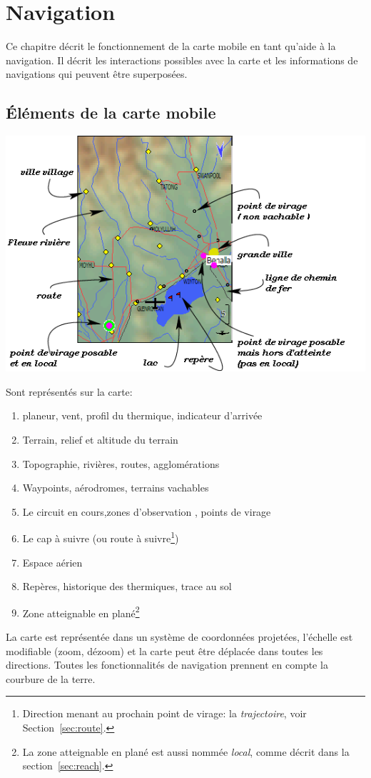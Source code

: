 \chapter{Navigation}\label{cha:navigation}
Ce chapitre décrit le fonctionnement de la carte mobile en tant qu'aide à la navigation.
Il décrit  les interactions possibles avec la carte et les informations de navigations qui peuvent être superposées.

\section{Éléments de la carte mobile}

\begin{maxipage}
\includegraphics[angle=0,width=0.9\linewidth,keepaspectratio='true']{figures/fig-map.png}
\end{maxipage}

Sont représentés sur la carte:
\begin{enumerate}
\item planeur, vent, profil du thermique, indicateur d'arrivée
\item Terrain, relief et altitude du terrain
\item Topographie, rivières, routes, agglomérations
\item Waypoints, aérodromes, terrains vachables
\item Le circuit en cours,zones d'observation , points de virage
\item Le cap à suivre (ou route à suivre\footnote{Direction menant au prochain point de virage: la  {\em trajectoire}, voir Section~\ref{sec:route}.})
\item Espace aérien
\item Repères, historique des thermiques, trace au sol
\item Zone atteignable en plané\footnote{La zone atteignable en plané est aussi nommée {\em local}, comme décrit dans la  section~\ref{sec:reach}.}
\end{enumerate}
La carte est représentée dans un système de coordonnées projetées, l'échelle est modifiable (zoom, dézoom) et la carte peut être déplacée dans toutes les directions. Toutes les fonctionnalités de navigation prennent en compte la courbure de la terre.

